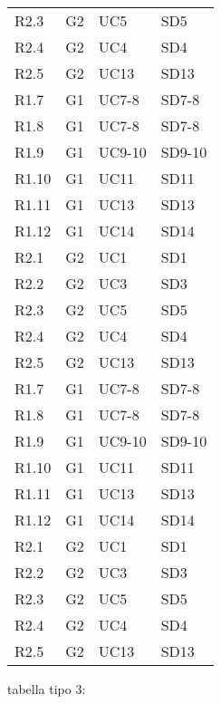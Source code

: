 \begin{longtable}{|p{}|p{}|p{}|p{}|}
    R2.3 & G2 & UC5    & SD5  \\
    R2.4 & G2 & UC4    & SD4  \\
    R2.5 & G2 & UC13   & SD13 \\
    R1.7 & G1 & UC7-8  & SD7-8 \\
    R1.8 & G1 & UC7-8  & SD7-8 \\
    R1.9 & G1 & UC9-10 & SD9-10 \\
    R1.10 & G1 & UC11  & SD11 \\
    R1.11 & G1 & UC13  & SD13 \\
    R1.12 & G1 & UC14  & SD14 \\
    R2.1 & G2 & UC1    & SD1  \\
    R2.2 & G2 & UC3    & SD3  \\
    R2.3 & G2 & UC5    & SD5  \\
    R2.4 & G2 & UC4    & SD4  \\
    R2.5 & G2 & UC13   & SD13 \\
    R1.7 & G1 & UC7-8  & SD7-8 \\
    R1.8 & G1 & UC7-8  & SD7-8 \\
    R1.9 & G1 & UC9-10 & SD9-10 \\
    R1.10 & G1 & UC11  & SD11 \\
    R1.11 & G1 & UC13  & SD13 \\
    R1.12 & G1 & UC14  & SD14 \\
    R2.1 & G2 & UC1    & SD1  \\
    R2.2 & G2 & UC3    & SD3  \\
    R2.3 & G2 & UC5    & SD5  \\
    R2.4 & G2 & UC4    & SD4  \\
    R2.5 & G2 & UC13   & SD13 \\
    
    \end{longtable}

    tabella tipo 3:

